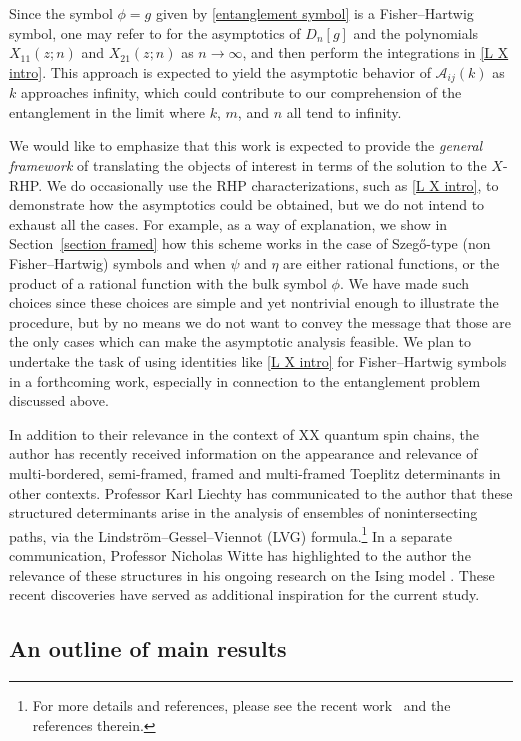 \documentclass[pdftex]{sigma}
\numberwithin{equation}{section}
\begin{document}
	Since the symbol $\phi=g$ given by \eqref{entanglement symbol} is a Fisher--Hartwig symbol, one may refer to \cite{DIK} for the asymptotics of $D_{n}[g]$ and the polynomials $X_{11}(z;n)$ and $X_{21}(z;n)$ as $n \to \infty$, and then perform the integrations in \eqref{L X intro}. This approach is expected to yield the asymptotic behavior of $\mathscr{A}_{ij}(k)$ as $k$ approaches infinity, which could contribute to our comprehension of the entanglement in the limit where $k$, $m$, and $n$ all tend to infinity.
	
	
	We would like to emphasize that this work is expected to provide the \textit{general framework} of translating the objects of interest in terms of the solution to the $X$-RHP. We do occasionally use the RHP characterizations, such as \eqref{L X intro}, to demonstrate how the asymptotics could be obtained, but we do not intend to exhaust all the cases. For example, as a way of explanation, we show in Section~\ref{section framed} how this scheme works in the case of Szeg\H{o}-type (non Fisher--Hartwig) symbols and when $\psi$ and $\eta$ are either rational functions, or the product of a rational function with the bulk symbol $\phi$. We have made such choices since these choices are simple and yet nontrivial enough to illustrate the procedure, but by no means we do not want to convey the message that those are the only cases which can make the asymptotic analysis feasible. We plan to undertake the task of using identities like \eqref{L X intro} for Fisher--Hartwig symbols in a forthcoming work, especially in connection to the entanglement problem discussed above.
	
	In addition to their relevance in the context of XX quantum spin chains, the author has recently received information on the appearance and relevance of multi-bordered, semi-framed, framed and multi-framed Toeplitz determinants in other contexts. Professor Karl Liechty has communicated to the author that these structured determinants arise in the analysis of ensembles of nonintersecting paths, via the Lindstr\"om--Gessel--Viennot (LVG) formula.\footnote{For more details and references, please see the recent work~\cite{GL24} and the references therein.} In a separate communication, Professor Nicholas Witte has highlighted to the author the relevance of these structures in his ongoing research on the Ising model \cite{W}. These recent discoveries have served as additional inspiration for the current study.	
	
\subsection{An outline of main results}
	
\end{document}
